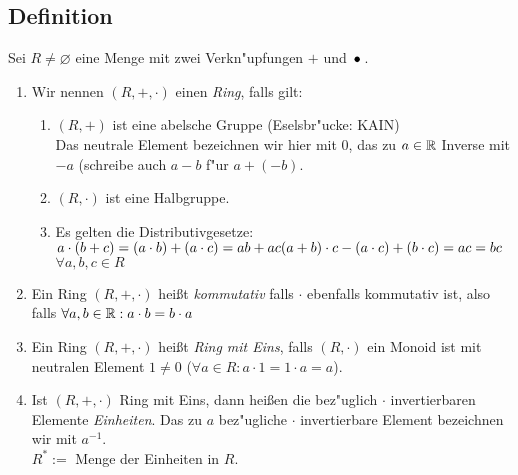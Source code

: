 \subsection[Definition: Ring]{Definition} \label{ring}
Sei $R \neq \varnothing$ eine Menge mit zwei Verkn"upfungen $+$ und $\,{\bullet}\,$.
{\renewcommand{\labelenumi}{(\roman{enumi})}
\begin{enumerate}
	\item
	Wir nennen $(R, +, \cdot)$ einen \emph{Ring}, falls gilt:
	{\renewcommand{\labelenumi}{\arabic{enumi})}\begin{enumerate}
		\item
		$(R,+)$ ist eine abelsche Gruppe (Eselsbr"ucke: KAIN)\\
		Das neutrale Element bezeichnen wir hier mit $0$, das zu $a \in \mathbb{R}$ Inverse mit $-a$ (schreibe auch $a-b$ f"ur $a+(-b)$.
		\item
		$(R,\cdot)$ ist eine Halbgruppe.
		\item
		Es gelten die Distributivgesetze:\\
		$a\cdot (b+c) = (a \cdot b) + (a \cdot c) = ab + ac\\
		(a+b) \cdot c - (a \cdot c) + (b \cdot c) = ac = bc$ \qquad $\forall a, b, c \in R$
	\end{enumerate}}
	\item
	Ein Ring $(R,+, \cdot)$ heißt \emph{kommutativ} falls $\cdot$ ebenfalls kommutativ ist, also falls ${\forall a,b \in \mathbb{R}: a \cdot b = b \cdot a}$
	\item
	Ein Ring $(R,+, \cdot)$ heißt \emph{Ring mit Eins}, falls $(R, \cdot)$ ein Monoid ist mit neutralen Element $1\neq 0$ \;($\forall a \in R: a \cdot 1 = 1 \cdot a = a$).
	\item
	Ist $(R, +, \cdot)$ Ring mit Eins, dann heißen die bez"uglich $\cdot$ invertierbaren Elemente \emph{Einheiten}. Das zu $a$ bez"ugliche $\cdot$
	invertierbare Element bezeichnen wir mit $a^{-1}$.\\ $R^* :=$ Menge der Einheiten in $R$.
\end{enumerate}}
